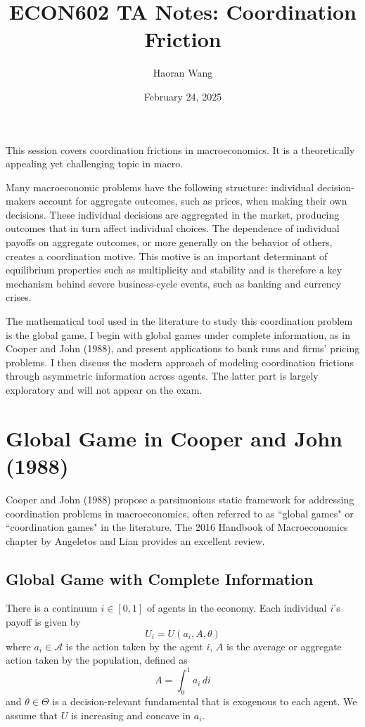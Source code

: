 \documentclass[12pt]{article}
\title{ECON602 TA Notes: Coordination Friction}
\author{Haoran Wang}
\date{February 24, 2025}
\begin{document}
	\maketitle
	
	\tableofcontents 
	
	This session covers coordination frictions in macroeconomics. It is a theoretically appealing yet challenging topic in macro.
	
		Many macroeconomic problems have the following structure: individual decision-makers account for aggregate outcomes, such as prices, when making their own decisions. These individual decisions are aggregated in the market, producing outcomes that in turn affect individual choices. The dependence of individual payoffs on aggregate outcomes, or more generally on the behavior of others, creates a coordination motive. This motive is an important determinant of equilibrium properties such as multiplicity and stability and is therefore a key mechanism behind severe business-cycle events, such as banking and currency crises. 
	
		The mathematical tool used in the literature to study this coordination problem is the global game. I begin with global games under complete information, as in Cooper and John (1988), and present applications to bank runs and firms' pricing problems. I then discuss the modern approach of modeling coordination frictions through asymmetric information across agents. The latter part is largely exploratory and will not appear on the exam.
		
	\section{Global Game in Cooper and John (1988)}
	
		Cooper and John (1988) propose a parsimonious static framework for addressing coordination problems in macroeconomics, often referred to as ``global games" or ``coordination games" in the literature. The 2016 Handbook of Macroeconomics chapter by Angeletos and Lian provides an excellent review. 
	
	\subsection{Global Game with Complete Information}
	
	There is a continuum $i \in [0,1]$ of agents in the economy. Each individual $i$'s payoff is given by
	\begin{equation}
		U_i = U(a_i, A, \theta)
	\end{equation}
where $a_i \in \mathcal{A}$ is the action taken by the agent $i$, $A$ is the average or aggregate action taken by the population, defined as
\begin{equation}
	A = \int_0^1 a_i \, di
\end{equation}
and $\theta \in \Theta$ is a decision-relevant fundamental that is exogenous to each agent. We assume that $U$ is increasing and concave in $a_i$.
\end{document}

